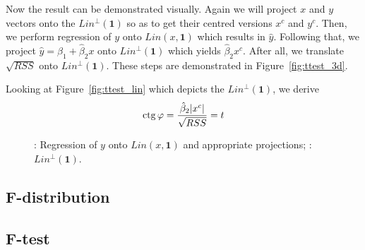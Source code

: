 Now the result can be demonstrated visually.
Again we will project $x$ and $y$ vectors onto the $Lin^{\perp}(\mathbf{1})$ so as to
get their centred versions $x^c$ and $y^c$.
Then, we perform regression of $y$ onto $Lin(x, \mathbf{1})$ which results in $\hat y$.
Following that, we project $\hat y = \hat \beta_1 + \hat \beta_2 x$ onto $Lin^{\perp}(\mathbf{1})$
which yields $\hat \beta_2 x^c$.
After all, we translate $\sqrt{RSS}$ onto $Lin^{\perp}(\mathbf{1})$.
These steps are demonstrated in Figure~\ref{fig:ttest_3d}.

Looking at Figure~\ref{fig:ttest_lin} which depicts the $Lin^{\perp}(\mathbf{1})$,
we derive
\[
\operatorname{ctg} \varphi = \frac{\hat \beta_2 \vert x^c \vert}{\sqrt{RSS}} = t
\]

\begin{figure}[ht!]
\begin{center}
\caption{: Regression of $y$ onto $Lin(x, \mathbf{1})$ and appropriate projections;
: $Lin^{\perp}(\mathbf{1})$.}
\end{center}
\end{figure}

\subsection{F-distribution}

\subsection{F-test}

